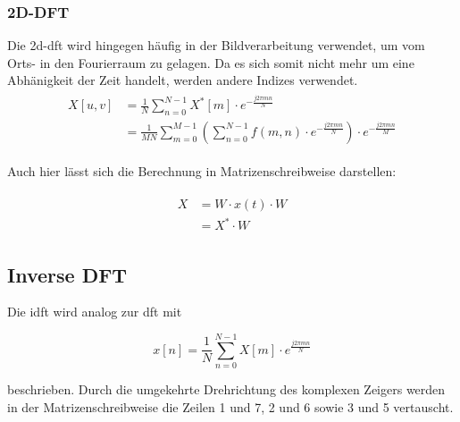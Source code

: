 \subsubsection{2D-DFT}
Die \gls{2d-dft} wird hingegen häufig in der Bildverarbeitung verwendet, um vom Orts- in den Fourierraum zu gelagen. Da es sich somit nicht mehr um eine Abhänigkeit 
der Zeit handelt, werden andere Indizes verwendet.
\begin{align}
\begin{split}
X[u,v] 	&= \frac{1}{N} \sum^{N-1}_{n=0} X^* \left[ m \right] \cdot e^{-\frac{j 2 \pi m n}{N}}\\
	&= \frac{1}{MN} \sum^{M-1}_{m=0} \left( \sum^{N-1}_{n=0} f(m,n) \cdot e^{-\frac{j 2 \pi m n}{N}} \right) \cdot e^{-\frac{j 2 \pi m n}{M}}
\end{split}
\end{align}

Auch hier lässt sich die Berechnung in Matrizenschreibweise darstellen:

\begin{align}
\begin{split}
 X &= W \cdot x\left(t\right) \cdot W \\
                    &= X^* \cdot W
\end{split}
\end{align}



\subsection{Inverse DFT}

Die \gls{idft} wird analog zur \gls{dft} mit 

\begin{equation}\label{eq:idft}
 x \left[ n \right] = \frac{1}{N} \sum^{N-1}_{n=0} X[m] \cdot e^{\frac{j 2 \pi m n}{N}}
\end{equation}

beschrieben. Durch die umgekehrte Drehrichtung des komplexen Zeigers werden in der Matrizenschreibweise die Zeilen 1 und 7, 2 und 6 sowie 3 und 5 vertauscht.



